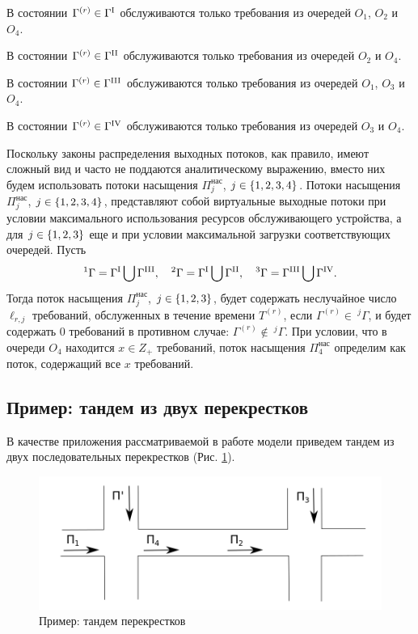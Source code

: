 \documentclass[a4paper,12pt,russian]{extarticle}
\newcommand{\G}{\Gamma}
\newcommand{\ga}[1]{\Gamma^{\left( #1 \right)} }
\newcommand{\Tt}[1]{T^{\left( #1 \right)} }
\begin{document}
В состоянии $\G^{(r)} \in \G^{\mathrm{\Rmnum{1}}}$ обслуживаются только требования из очередей $O_1$, $O_2$ и $O_4$.

В состоянии $\G^{(r)} \in \G^{\mathrm{\Rmnum{2}}}$ обслуживаются только требования из очередей $O_2$ и $O_4$.

В состоянии $\G^{(r)} \in \G^{\mathrm{\Rmnum{3}}}$ обслуживаются только требования из очередей $O_1$, $O_3$ и $O_4$.

В состоянии $\G^{(r)} \in \G^{\mathrm{\Rmnum{4}}}$ обслуживаются только требования из очередей $O_3$ и $O_4$.

Поскольку законы распределения выходных потоков, как правило, имеют сложный вид и часто не поддаются аналитическому выражению, вместо них будем использовать потоки насыщения $\Pi^{\mathrm{\text{нас}}}_j$, $j \in \left\{1,2,3,4\right\}$. Потоки насыщения $\Pi^{\mathrm{\text{нас}}}_j$, $j \in \left\{1,2,3,4\right\}$, представляют собой виртуальные выходные потоки при условии максимального использования ресурсов обслуживающего устройства, а для $j\in \left\{1, 2, 3\right\}$ еще и при условии максимальной загрузки соответствующих очередей. Пусть
\begin{equation}
^1\G=\G^{\mathrm{\Rmnum{1}}} \bigcup \G^{\mathrm{\Rmnum{3}}}, \quad
^2\G=\G^{\mathrm{\Rmnum{1}}} \bigcup \G^{\mathrm{\Rmnum{2}}}, \quad
^3\G=\G^{\mathrm{\Rmnum{3}}} \bigcup \G^{\mathrm{\Rmnum{4}}}.
\end{equation}
Тогда поток насыщения $\Pi^{\mathrm{\text{нас}}}_j$, $j\in \left\{1,2,3\right\}$, будет содержать неслучайное число $\ell_{r,j}$ требований, обслуженных в течение времени $\Tt{r}$, если $\ga{r} \in~^j\G$, и будет содержать $0$ требований в противном случае: $\ga{r} \notin ~^j\G$. При условии, что в очереди $O_4$ находится $x \in Z_+$ требований, поток насыщения $\Pi^{\mathrm{\text{нас}}}_4$ определим как поток, содержащий все $x$ требований.

\subsection{Пример: тандем из двух перекрестков}

В качестве приложения рассматриваемой в работе модели приведем тандем из двух последовательных перекрестков (Рис. \ref{crossroads}).

\begin{figure}[h]
\includegraphics[scale=0.5]{Crossroads.png} 
\caption{Пример: тандем перекрестков}
\label{crossroads}
\end{figure}
\end{document}
